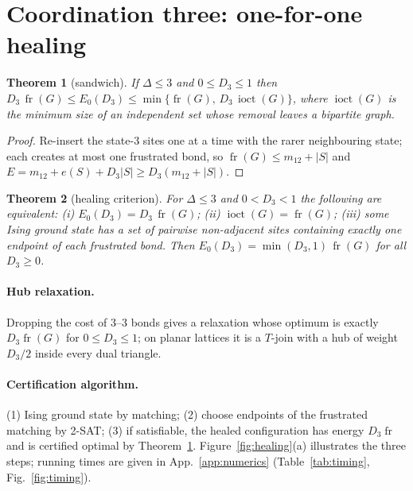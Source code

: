 \documentclass[aps,pre,twocolumn,superscriptaddress,showpacs]{revtex4-2}
\newtheorem{theorem}{Theorem}
\theoremstyle{definition}
\theoremstyle{remark}
\newcommand{\fr}{\operatorname{fr}}
\newcommand{\ioct}{\operatorname{ioct}}
\newcommand{\OPT}{E_0}
\begin{document}
\section{Coordination three: one-for-one healing}
\label{sec:healing}
\begin{theorem}[sandwich]\label{thm:sandwich}
If $\Delta\le3$ and $0\le D_3\le1$ then
$D_3\,\fr(G)\le\OPT(D_3)\le\min\{\fr(G),\,D_3\,\ioct(G)\}$, where $\ioct(G)$ is the minimum
size of an independent set whose removal leaves a bipartite graph.
\end{theorem}
\begin{proof}
Re-insert the state-3 sites one at a time with the rarer neighbouring state; each creates at
most one frustrated bond, so $\fr(G)\le m_{12}+|S|$ and
$E=m_{12}+e(S)+D_3|S|\ge D_3(m_{12}+|S|)$.
\end{proof}

\begin{theorem}[healing criterion]\label{thm:healing}
For $\Delta\le3$ and $0<D_3<1$ the following are equivalent:
(i) $\OPT(D_3)=D_3\,\fr(G)$; (ii) $\ioct(G)=\fr(G)$; (iii) some Ising ground state has a set of
pairwise non-adjacent sites containing exactly one endpoint of each frustrated bond.
Then $\OPT(D_3)=\min(D_3,1)\,\fr(G)$ for all $D_3\ge0$.
\end{theorem}

\paragraph*{Hub relaxation.} Dropping the cost of 3--3 bonds gives a relaxation whose optimum is
exactly $D_3\fr(G)$ for $0\le D_3\le1$; on planar lattices it is a $T$-join with a hub of weight
$D_3/2$ inside every dual triangle.

\paragraph*{Certification algorithm.} (1) Ising ground state by matching; (2) choose endpoints of
the frustrated matching by 2-SAT; (3) if satisfiable, the healed configuration has energy
$D_3\fr$ and is certified optimal by Theorem~\ref{thm:sandwich}. Figure~\ref{fig:healing}(a)
illustrates the three steps; running times are given in App.~\ref{app:numerics}
(Table~\ref{tab:timing}, Fig.~\ref{fig:timing}).
\end{document}
